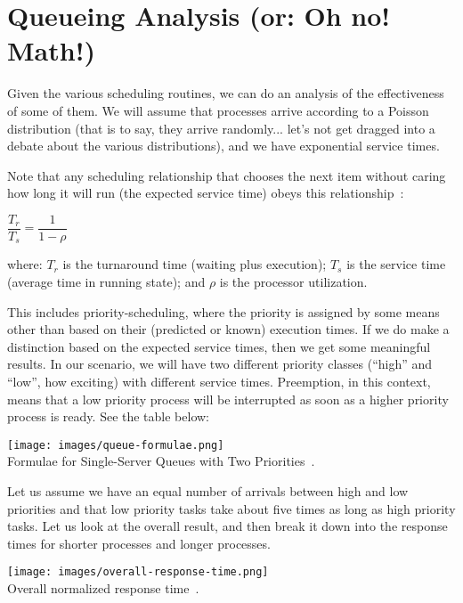 \section*{Queueing Analysis (or: Oh no! Math!)}
Given the various scheduling routines, we can do an analysis of the effectiveness of some of them. We will assume that processes arrive according to a Poisson distribution (that is to say, they arrive randomly... let's not get dragged into a debate about the various distributions), and we have exponential service times. 


Note that any scheduling relationship that chooses the next item without caring how long it will run (the expected service time) obeys this relationship~\cite{osi}:

\begin{center}
	$\dfrac{T_{r}}{T_{s}} = \dfrac{1}{1 - \rho}$
\end{center}

where: $T_{r}$ is the turnaround time (waiting plus execution); $T_{s}$ is the service time (average time in running state); and $\rho$ is the processor utilization.

This includes priority-scheduling, where the priority is assigned by some means other than based on their (predicted or known) execution times. If we do make a distinction based on the expected service times, then we get some meaningful results. In our scenario, we will have two different priority classes (``high'' and ``low'', how exciting) with different service times. Preemption, in this context, means that a low priority process will be interrupted as soon as a higher priority process is ready. See the table below:

\begin{center}
	\texttt{[image: images/queue-formulae.png]}\\
	Formulae for Single-Server Queues with Two Priorities~\cite{osi}.
\end{center}

Let us assume we have an equal number of arrivals between high and low priorities and that low priority tasks take about five times as long as high priority tasks. Let us look at the overall result, and then break it down into the response times for shorter processes and longer processes.

\begin{center}
	\texttt{[image: images/overall-response-time.png]}\\
	Overall normalized response time~\cite{osi}.
\end{center}


